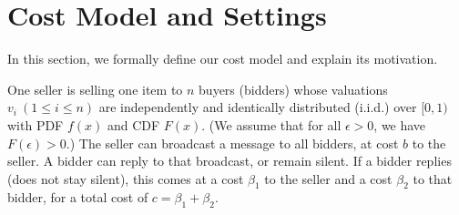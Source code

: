 \section{Cost Model and Settings}
\label{sec:model}

In this section, we formally define our cost model and explain its motivation. 


\begin{definition}[Setting]\label{def:model}
One seller is selling one item to $n$ buyers (bidders)
whose valuations $v_i~(1 \leq i \leq n)$ are independently and identically
distributed (i.i.d.) over $[0, 1)$ with PDF $f(x)$ and CDF $F(x)$. (We
assume that for all $\epsilon>0$, we have $F(\epsilon)>0$.)
The seller
can broadcast a message to all bidders, at cost $b$ to
the seller.  A bidder can reply to that broadcast, or remain silent.
If a bidder replies (does not stay silent), this comes at a cost $\beta_1$ to the
seller and a cost $\beta_2$ to that bidder, for a total cost of $c=\beta_1+\beta_2$.
\end{definition}

%

